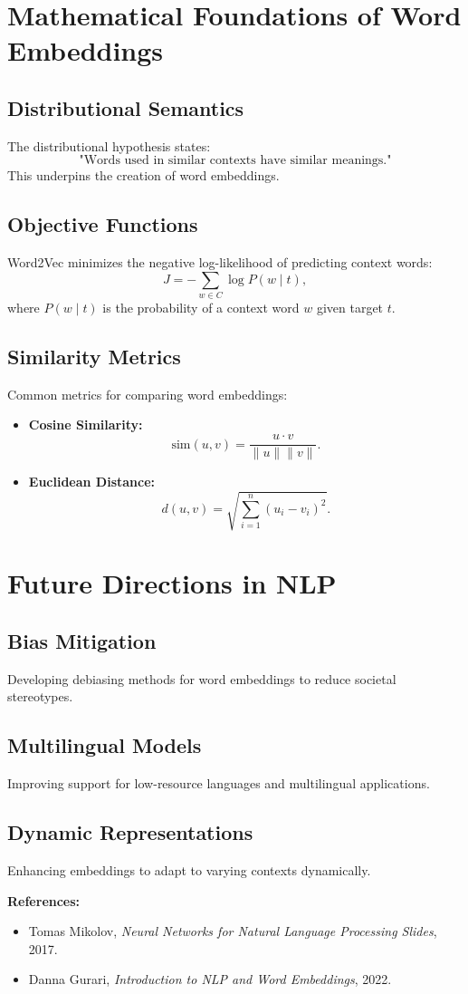 \documentclass[12pt]{article}
\begin{document}
\section{Mathematical Foundations of Word Embeddings}
\subsection{Distributional Semantics}
The distributional hypothesis states:
\[
\text{"Words used in similar contexts have similar meanings."}
\]
This underpins the creation of word embeddings.

\subsection{Objective Functions}
Word2Vec minimizes the negative log-likelihood of predicting context words:
\[
J = -\sum_{w \in C} \log P(w \mid t),
\]
where \(P(w \mid t)\) is the probability of a context word \(w\) given target \(t\).

\subsection{Similarity Metrics}
Common metrics for comparing word embeddings:
\begin{itemize}
    \item \textbf{Cosine Similarity:}
    \[
    \text{sim}(u, v) = \frac{u \cdot v}{\|u\| \|v\|}.
    \]
    \item \textbf{Euclidean Distance:}
    \[
    d(u, v) = \sqrt{\sum_{i=1}^n (u_i - v_i)^2}.
    \]
\end{itemize}

\section{Future Directions in NLP}
\subsection{Bias Mitigation}
Developing debiasing methods for word embeddings to reduce societal stereotypes.

\subsection{Multilingual Models}
Improving support for low-resource languages and multilingual applications.

\subsection{Dynamic Representations}
Enhancing embeddings to adapt to varying contexts dynamically.

\textbf{References:}
\begin{itemize}
    \item Tomas Mikolov, \textit{Neural Networks for Natural Language Processing Slides}, 2017.
    \item Danna Gurari, \textit{Introduction to NLP and Word Embeddings}, 2022.
\end{itemize}
\end{document}
